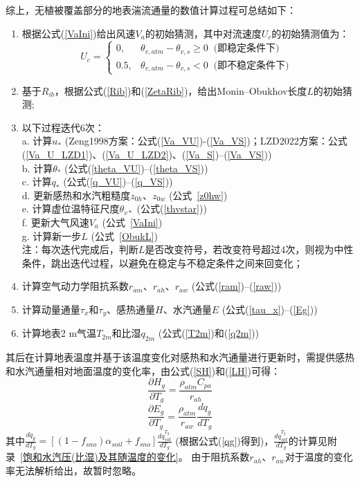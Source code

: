 综上，无植被覆盖部分的地表湍流通量的数值计算过程可总结如下：
\begin{enumerate}
     \item 根据公式(\ref{VaIni})给出风速$V_{a}$的初始猜测，其中对流速度$U_c$的初始猜测值为：
       \begin{equation}
          U_{c}= \begin{cases}
           0, & \theta_{v, atm}-\theta_{v, s} \geqslant 0\ \text { (即稳定条件下) } \\ 
           0.5, & \theta_{v, atm}-\theta_{v, s}<0\ \text { (即不稳定条件下) }
          \end{cases}
       \end{equation}
     \item 基于$R_{ib}$，根据公式(\ref{Rib})和(\ref{ZetaRib})，给出Monin--Obukhov长度$L$的初始猜测;
     \item 以下过程迭代6次：\\
     a. 计算$u_\ast$ (Zeng1998方案：公式(\ref{Va_VU})-(\ref{Va_VS})；LZD2022方案：公式(\ref{Va_U_LZD1})、(\ref{Va_U_LZD2})、(\ref{Va_S})--(\ref{Va_VS})) \\
     b. 计算$\theta_\ast$ (公式(\ref{theta_VU})--(\ref{theta_VS})) \\
     c. 计算$q_\ast$ (公式(\ref{q_VU})--(\ref{q_VS})) \\
     d. 更新感热和水汽粗糙度$z_{0h}$、$z_{0w}$ (公式~\eqref{z0hw}) \\
     e. 计算虚位温特征尺度$\theta_{v\ast}$ (公式(\ref{thvstar})) \\
     f. 更新大气风速$V_a$ (公式~\eqref{VaIni}) \\
     g. 计算新一步$L$ (公式~\eqref{ObukL}) \\
     注：每次迭代完成后，判断$L$是否改变符号，若改变符号超过4次，则视为中性条件，跳出迭代过程，以避免在稳定与不稳定条件之间来回变化；
     \item 计算空气动力学阻抗系数$r_{am}$、$r_{ah}$、$r_{aw}$ (公式(\ref{ram})--(\ref{raw}))
     \item 计算动量通量$\tau_{x}$和$\tau_{y}$、感热通量$H$、水汽通量$E$ (公式(\ref{tau_x})--(\ref{Eg}))
     \item 计算地表2 m气温$T_{2m}$和比湿$q_{2m}$ (公式(\ref{T2m})和(\ref{q2m}))
 \end{enumerate}

 其后在计算地表温度并基于该温度变化对感热和水汽通量进行更新时，需提供感热和水汽通量相对地面温度的变化率，由公式(\ref{SH})和(\ref{LH})可得：
\begin{equation}
     \frac{\partial H_{g}}{\partial T_{g}}=\frac{\rho_{atm} C_{p a}}{r_{a h}}
\end{equation}
\begin{equation}\label{Eg/Tg_1}
     \frac{\partial E_{g}}{\partial T_{g}}= \frac{\rho_{atm}}{r_{a w}} \frac{d q_{g}}{d T_{g}}
\end{equation}
其中$\frac{dq_g}{dT_g}=\left[\left(1-f_{sno}\right)\alpha_{soil}+f_{sno}\right]\frac{dq_{sat}^{T_g}}{dT_g}$ (根据公式(\ref{qg})得到)，$\frac{dq_{sat}^{T_g}}{dT_g}$的计算见附录~\ref{饱和水汽压(比湿)及其随温度的变化}。
由于阻抗系数$r_{ah}$、$r_{aw}$对于温度的变化率无法解析给出，故暂时忽略。


